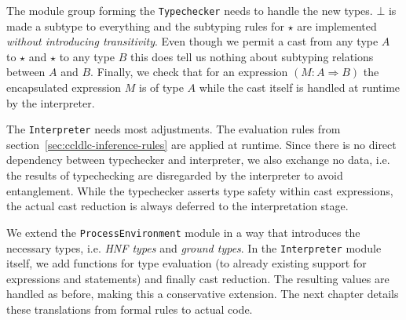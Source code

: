 The module group forming the \texttt{Typechecker} needs to handle the new types. $\bot$ is made a subtype to everything and the subtyping rules for $\star$ are implemented \emph{without introducing transitivity}. Even though we permit a cast from any type $A$ to $\star$ and $\star$ to any type $B$ this does tell us nothing about subtyping relations between $A$ and $B$. Finally, we check that for an expression $(M : A \Rightarrow B)$ the encapsulated expression $M$ is of type $A$ while the cast itself is handled at runtime by the interpreter.

The \texttt{Interpreter} needs most adjustments. The evaluation rules from section~\ref{sec:ccldlc-inference-rules} are applied at runtime. Since there is no direct dependency between typechecker and interpreter, we also exchange no data, i.e. the results of typechecking are disregarded by the interpreter to avoid entanglement. While the typechecker asserts type safety within cast expressions, the actual cast reduction is always deferred to the interpretation stage.

We extend the \texttt{ProcessEnvironment} module in a way that introduces the necessary types, i.e. \emph{HNF types} and \emph{ground types}. In the \texttt{Interpreter} module itself, we add functions for type evaluation (to already existing support for expressions and statements) and finally cast reduction. The resulting values are handled as before, making this a conservative extension. The next chapter details these translations from formal rules to actual code.
